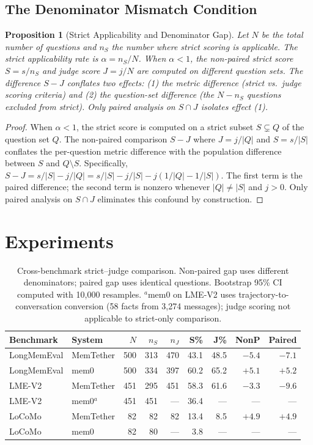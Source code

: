 \documentclass[10pt]{article}
\newtheorem{proposition}{Proposition}
\begin{document}
\subsection{The Denominator Mismatch Condition}
\begin{proposition}[Strict Applicability and Denominator Gap]
\label{prop:strictgap}
Let $N$ be the total number of questions and $n_S$ the number where strict scoring is applicable. The strict applicability rate is $\alpha = n_S / N$. When $\alpha < 1$, the non-paired strict score $S = s/n_S$ and judge score $J = j/N$ are computed on different question sets. The difference $S - J$ conflates two effects: (1) the metric difference (strict vs.\ judge scoring criteria) and (2) the question-set difference (the $N - n_S$ questions excluded from strict). Only paired analysis on $S \cap J$ isolates effect (1).
\end{proposition}
\begin{proof}
When $\alpha < 1$, the strict score is computed on a strict subset $S \subsetneq Q$ of the question set $Q$. The non-paired comparison $S - J$ where $J = j/|Q|$ and $S = s/|S|$ conflates the per-question metric difference with the population difference between $S$ and $Q \setminus S$. Specifically, $S - J = s/|S| - j/|Q| = s/|S| - j/|S| - j(1/|Q| - 1/|S|)$. The first term is the paired difference; the second term is nonzero whenever $|Q| \neq |S|$ and $j > 0$. Only paired analysis on $S \cap J$ eliminates this confound by construction.
\end{proof}

\section{Experiments}

\begin{table}[t]
\centering
\caption{Cross-benchmark strict--judge comparison. Non-paired gap uses different denominators; paired gap uses identical questions. Bootstrap 95\% CI computed with 10{,}000 resamples. $^a$mem0 on LME-V2 uses trajectory-to-conversation conversion (58 facts from 3{,}274 messages); judge scoring not applicable to strict-only comparison.}
\label{tab:main}
\begin{tabular}{llrrrrrrr}
\toprule
Benchmark & System & $N$ & $n_S$ & $n_J$ & S\% & J\% & NonP & Paired \\
\midrule
LongMemEval & MemTether & 500 & 313 & 470 & 43.1 & 48.5 & $-5.4$ & $-7.1$ \\
LongMemEval & mem0 & 500 & 334 & 397 & 60.2 & 65.2 & $+5.1$ & $+5.2$ \\
LME-V2 & MemTether & 451 & 295 & 451 & 58.3 & 61.6 & $-3.3$ & $-9.6$ \\
LME-V2 & mem0$^a$ & 451 & 451 & --- & 36.4 & --- & --- & --- \\
LoCoMo & MemTether & 82 & 82 & 82 & 13.4 & 8.5 & $+4.9$ & $+4.9$ \\
LoCoMo & mem0 & 82 & 80 & --- & 3.8 & --- & --- & --- \\
\bottomrule
\end{tabular}
\end{table}
\end{document}
